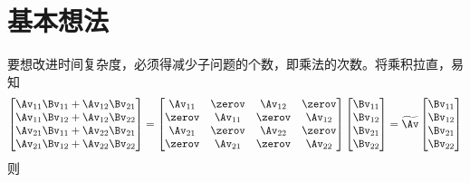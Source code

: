 \documentclass{ctexart}
\begin{document}
\section{基本想法}

要想改进时间复杂度，必须得减少子问题的个数，即乘法的次数。将乘积拉直，易知
\begin{align*}
    \begin{bmatrix}
        \Av_{11} \Bv_{11} + \Av_{12} \Bv_{21} \\
        \Av_{11} \Bv_{12} + \Av_{12} \Bv_{22} \\
        \Av_{21} \Bv_{11} + \Av_{22} \Bv_{21} \\
        \Av_{21} \Bv_{12} + \Av_{22} \Bv_{22}
    \end{bmatrix} =
    \begin{bmatrix}
        \Av_{11} & \zerov   & \Av_{12} & \zerov   \\
        \zerov   & \Av_{11} & \zerov   & \Av_{12} \\
        \Av_{21} & \zerov   & \Av_{22} & \zerov   \\
        \zerov   & \Av_{21} & \zerov   & \Av_{22}
    \end{bmatrix}
    \begin{bmatrix}
        \Bv_{11} \\ \Bv_{12} \\ \Bv_{21} \\ \Bv_{22}
    \end{bmatrix} = \widetilde{\Av}
    \begin{bmatrix}
        \Bv_{11} \\ \Bv_{12} \\ \Bv_{21} \\ \Bv_{22}
    \end{bmatrix}
\end{align*}
则
\end{document}
